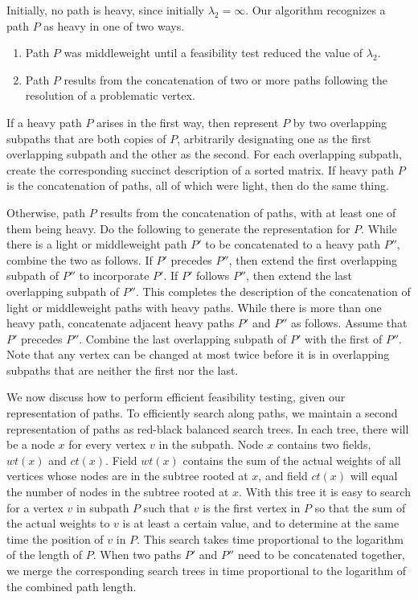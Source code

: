 Initially, no path is heavy, since initially $\lambda_2=\infty$. 
Our algorithm recognizes a path $P$ as heavy in one of two ways.
\begin{enumerate}
\item
Path $P$ was middleweight until a feasibility test reduced the value of $\lambda_2$.
\item
Path $P$ results from the concatenation of two or more paths following the resolution of a problematic vertex.
\end{enumerate}

If a heavy path $P$ arises in the first way, then represent $P$ by two overlapping subpaths that are both copies of $P$, arbitrarily designating one as the first overlapping subpath and the other as the second. For each overlapping subpath, create the corresponding succinct description of a sorted matrix. 
If heavy path $P$ is the concatenation of paths, all of which were light, then do the same thing.

Otherwise, path $P$ results from the concatenation of paths, with at least one of them being heavy. 
Do the following to generate the representation for $P$. 
While there is a light or middleweight path $P'$ to be concatenated to a heavy path $P''$, combine the two as follows. If $P'$ precedes $P''$, then extend the first overlapping subpath of $P''$ to incorporate $P'$. 
If $P'$ follows $P''$, then extend the last overlapping subpath of $P''$. 
This completes the description of the concatenation of light or middleweight paths with heavy paths. 
While there is more than one heavy path, concatenate adjacent heavy paths $P'$ and $P''$ as follows. 
Assume that $P'$ precedes $P''$. Combine the last overlapping subpath of $P'$ with the first of $P''$. 
Note that any vertex can be changed at most twice before it is in overlapping subpaths that are neither the first nor the last. 

We now discuss how to perform efficient feasibility testing, given our representation of paths. 
To efficiently search along paths, we maintain a second representation of paths as red-black balanced search trees. 
In each tree, there will be a node $x$ for every vertex $v$ in the subpath. 
Node $x$ contains two fields, $wt(x)$ and $ct(x)$. Field $wt(x)$ contains the sum of the actual weights of all vertices whose nodes are in the subtree rooted at $x$, and field $ct(x)$ will equal the number of nodes in the subtree rooted at $x$. 
With this tree it is easy to search for a vertex $v$ in subpath $P$ such that $v$ is the first vertex in $P$ so that the sum of the actual weights to $v$ is at least a certain value, and to determine at the same time the position of $v$ in $P$. 
This search takes time proportional to the logarithm of the length of $P$. 
When two paths $P'$ and $P''$ need to be concatenated together, we merge the corresponding search trees in time proportional to the logarithm of the combined path length.

